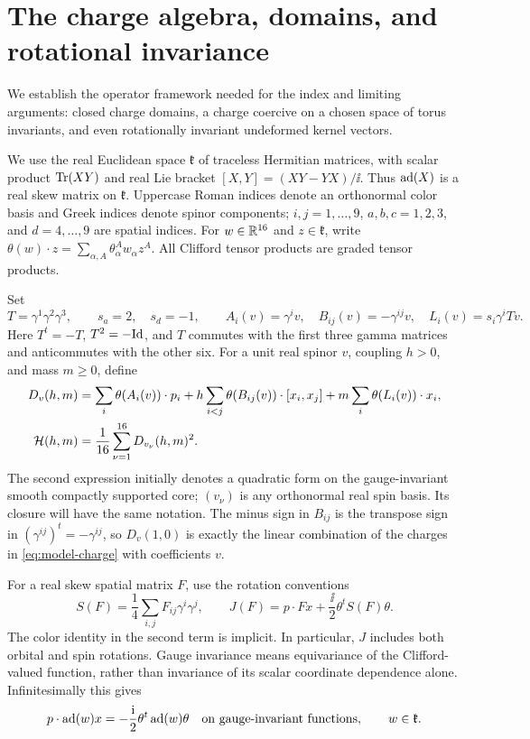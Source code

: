 \section{The charge algebra, domains, and rotational invariance}
\label{sec:algebra}

We establish the operator framework needed for the index and limiting
arguments: closed charge domains, a charge coercive on a chosen space
of torus invariants, and even rotationally invariant undeformed kernel
vectors.

We use the real Euclidean space \(\mathfrak k\) of traceless Hermitian
matrices, with scalar product \(\operatorname{Tr}(XY)\) and real Lie bracket
\([X,Y]=(XY-YX)/\ii\). Thus \(\operatorname{ad}(X)\) is a real skew matrix on
\(\mathfrak k\). Uppercase Roman indices denote an orthonormal color
basis and Greek indices denote spinor components;
\(i,j=1,\ldots,9\), \(a,b,c=1,2,3\), and \(d=4,\ldots,9\) are spatial
indices. For \(w\in\mathbb R^{16}\) and \(z\in\mathfrak k\), write
\(\theta(w)\cdot z=\sum_{\alpha,A}\theta_\alpha^A w_\alpha z^A\).
All Clifford tensor products are graded tensor products.

Set
\[
 T=\gamma^1\gamma^2\gamma^3,\qquad
 s_a=2,\quad s_d=-1,
 \qquad A_i(v)=\gamma^i v,\quad
 B_{ij}(v)=-\gamma^{ij}v,\quad L_i(v)=s_i\gamma^iTv.
\]
Here \(T^t=-T\), \(T^2=-\mathrm{Id}\), and \(T\) commutes with the first
three gamma matrices and anticommutes with the other six. For a unit
real spinor \(v\), coupling \(h>0\), and mass \(m\geq0\), define
\begin{equation}
\label{eq:deformed-charge}
\begin{aligned}
 D_v(h,m)&=\sum_i\theta(A_i(v))\cdot p_i
 +h\sum_{i<j}\theta(B_{ij}(v))\cdot[x_i,x_j]
 +m\sum_i\theta(L_i(v))\cdot x_i,\\
 \mathcal H(h,m)&=\frac1{16}\sum_{\nu=1}^{16}D_{v_\nu}(h,m)^2.
\end{aligned}
\end{equation}
The second expression initially denotes a quadratic form on the
gauge-invariant smooth compactly supported core; \((v_\nu)\) is any
orthonormal real spin basis. Its closure will have the same notation.
The minus sign in \(B_{ij}\) is the transpose sign in
\((\gamma^{ij})^t=-\gamma^{ij}\), so \(D_v(1,0)\) is exactly the
linear combination of the charges in \eqref{eq:model-charge} with
coefficients \(v\).

For a real skew spatial matrix \(F\), use the rotation conventions
\begin{equation}
\label{alg:rotation-generator}
 S(F)=\frac14\sum_{i,j}F_{ij}\gamma^i\gamma^j,
 \qquad
 J(F)=p\cdot Fx+\frac{\ii}{2}\theta^t S(F)\theta.
\end{equation}
The color identity in the second term is implicit. In particular,
\(J\) includes both orbital and spin rotations. Gauge invariance means
equivariance of the Clifford-valued function, rather than invariance
of its scalar coordinate dependence alone. Infinitesimally this gives
\begin{equation}
\label{alg:gauge-generator}
 p\cdot\operatorname{ad}(w)x=-\frac{\mathrm i}{2}\theta^t\operatorname{ad}(w)\theta
 \quad\text{on gauge-invariant functions},\qquad w\in\mathfrak k.
\end{equation}


